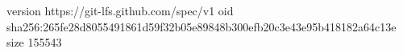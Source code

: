 version https://git-lfs.github.com/spec/v1
oid sha256:265fe28d8055491861d59f32b05e89848b300efb20c3e43e95b418182a64c13e
size 155543
